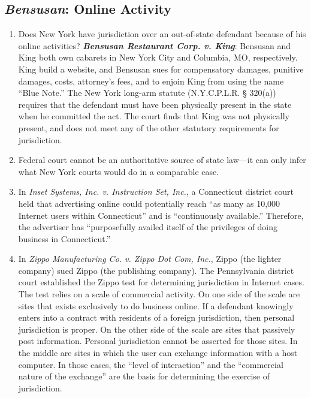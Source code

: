\subsection{\emph{Bensusan}: Online Activity}

\begin{enumerate}
    \item Does New York have jurisdiction over an out-of-state defendant because of his online activities? \textbf{\emph{Bensusan Restaurant Corp. v. King}}: Bensusan and King both own cabarets in New York City and Columbia, MO, respectively. King build a website, and Bensusan sues for compensatory damages, punitive damages, costs, attorney's fees, and to enjoin King from using the name ``Blue Note.'' The New York long-arm statute (N.Y.C.P.L.R. § 320(a)) requires that the defendant must have been physically present in the state when he committed the act. The court finds that King was not physically present, and does not meet any of the other statutory requirements for jurisdiction.
    \item Federal court cannot be an authoritative source of state law---it can only infer what New York courts would do in a comparable case.
    \item In \emph{Inset Systems, Inc. v. Instruction Set, Inc.}, a Connecticut district court held that advertising online could potentially reach ``as many as 10,000 Internet users within Connecticut'' and is ``continuously available.'' Therefore, the advertiser has ``purposefully availed itself of the privileges of doing business in Connecticut.''
    \item In \emph{Zippo Manufacturing Co. v. Zippo Dot Com, Inc.}, Zippo (the lighter company) sued Zippo (the publishing company). The Pennsylvania district court established the Zippo test for determining jurisdiction in Internet cases. The test relies on a scale of commercial activity. On one side of the scale are sites that exists exclusively to do business online. If a defendant knowingly enters into a contract with residents of a foreign jurisdiction, then personal jurisdiction is proper. On the other side of the scale are sites that passively post information. Personal jurisdiction cannot be asserted for those sites. In the middle are sites in which the user can exchange information with a host computer. In those cases, the ``level of interaction'' and the ``commercial nature of the exchange'' are the basis for determining the exercise of jurisdiction. 
\end{enumerate}

